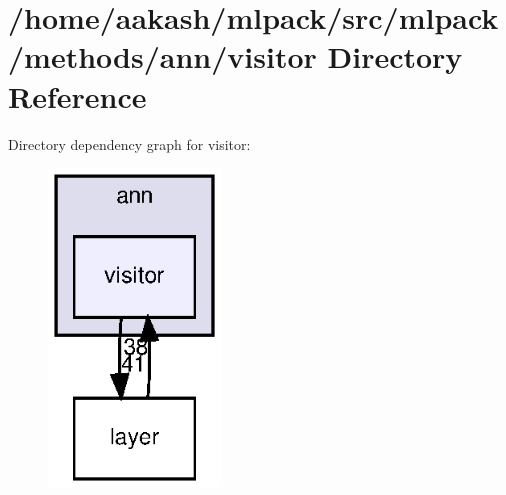 \section{/home/aakash/mlpack/src/mlpack/methods/ann/visitor Directory Reference}
\label{dir_b555923761b25372c22bbdf14676b4b4}
Directory dependency graph for visitor\+:
\nopagebreak
\begin{figure}[H]
\begin{center}
\leavevmode
\includegraphics[width=130pt]{dir_b555923761b25372c22bbdf14676b4b4_dep}
\end{center}
\end{figure}
